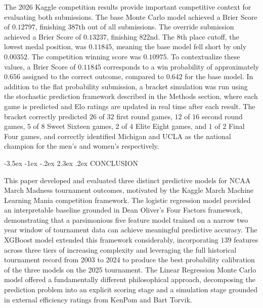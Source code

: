 \documentclass[12pt,leqno]{article}\usepackage[pdftex]{graphicx}\usepackage[dvipsnames]{xcolor}
\makeatletter
\renewcommand\section{\@startsection {section}{1}{\z@}%
{-3.5ex \@plus -1ex \@minus -.2ex}%
{2.3ex \@plus.2ex}%
{\normalfont\centering}}
\theoremstyle{remark}
\makeatother
\begin{document}
The 2026 Kaggle competition results provide important competitive context for evaluating both submissions. The base Monte Carlo model achieved a Brier Score of $0.12797$, finishing 387th out of all submissions. The override submission achieved a Brier Score of $0.13237$, finishing 822nd. The 8th place cutoff, the lowest medal position, was $0.11845$, meaning the base model fell short by only $0.00352$. The competition winning score was $0.10975$. To contextualize these values, a Brier Score of $0.11845$ corresponds to a win probability of approximately $0.656$ assigned to the correct outcome, compared to $0.642$ for the base model. In addition to the flat probability submission, a bracket simulation was run using the stochastic prediction framework described in the Methods section, where each game is predicted and Elo ratings are updated in real time after each result. The bracket correctly predicted $26$ of $32$ first round games, $12$ of $16$ second round games, $5$ of $8$ Sweet Sixteen games, $2$ of $4$ Elite Eight games, and $1$ of $2$ Final Four games, and correctly identified Michigan and UCLA as the national champion for the men's and women's respectively.

\newpage

\begin{center}
\section{CONCLUSION}
\end{center}
\thispagestyle{empty} %
This paper developed and evaluated three distinct predictive models for NCAA March Madness tournament outcomes, motivated by the Kaggle March Machine Learning Mania competition framework. The logistic regression model provided an interpretable baseline grounded in Dean Oliver's Four Factors framework, demonstrating that a parsimonious five feature model trained on a narrow two year window of tournament data can achieve meaningful predictive accuracy. The XGBoost model extended this framework considerably, incorporating $139$ features across three tiers of increasing complexity and leveraging the full historical tournament record from 2003 to 2024 to produce the best probability calibration of the three models on the 2025 tournament. The Linear Regression Monte Carlo model offered a fundamentally different philosophical approach, decomposing the prediction problem into an explicit scoring stage and a simulation stage grounded in external efficiency ratings from KenPom and Bart Torvik.
\end{document}
